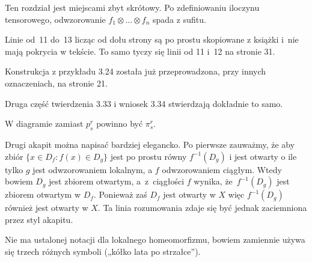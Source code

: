 \documentclass[a4paper,11pt]{article}
\begin{document}
\vspace{\spaceFour}



\start {} Ten rozdział jest miejscami zbyt skrótowy. Po
zdefiniowaniu iloczynu tensorowego, odwzorowanie
$f_{ 1 } \otimes \ldots \otimes f_{ n }$ spada z sufitu.

\vspace{\spaceFour}



\start {} Linie od~11 do~13 licząc od dołu strony są po prostu
skopiowane z książki \cite{GancarzewiczAlgebraLiniowa2004} i~nie mają pokrycia w tekście. To
samo tyczy się linii od 11 i~12 na stronie 31.

\vspace{\spaceFour}



\start {} Konstrukcja z przykładu 3.24 została już
przeprowadzona, przy innych oznaczeniach, na stronie 21.

\vspace{\spaceFour}



\start {} Druga część twierdzenia 3.33 i wniosek 3.34
stwierdzają dokładnie to samo.

\vspace{\spaceFour}



\start {} W diagramie zamiast $p^{ r }_{ s }$ powinno być
$\pi^{ r }_{ s }$.

\vspace{\spaceFour}



\start {} Drugi akapit można napisać bardziej elegancko. Po
pierwsze zauważmy, że aby zbiór \linebreak
$\{ x \in D_{ f } : f( x ) \in D_{ g } \}$ jest po prostu równy
$f^{ -1 }( D_{ g } )$ i jest otwarty o ile tylko $g$ jest
odwzorowaniem lokalnym, a $f$ odwzorowaniem ciągłym. Wtedy bowiem
$D_{ g }$ jest zbiorem otwartym, a~z~ciągłości $f$ wynika,
że~$f^{ -1 }( D_{ g } )$ jest zbiorem otwartym w $D_{ f }$. Ponieważ
zaś $D_{ f }$ jest otwarty w $X$ więc $f^{ -1 }( D_{ g } )$ również
jest otwarty w $X$. Ta linia rozumowania zdaje się być jednak
zaciemniona przez styl akapitu.

\vspace{\spaceFour}



\start {} Nie ma ustalonej notacji dla lokalnego homeomorfizmu,
bowiem zamiennie używa się trzech różnych symboli („kółko lata po
strzałce”).
\end{document}
